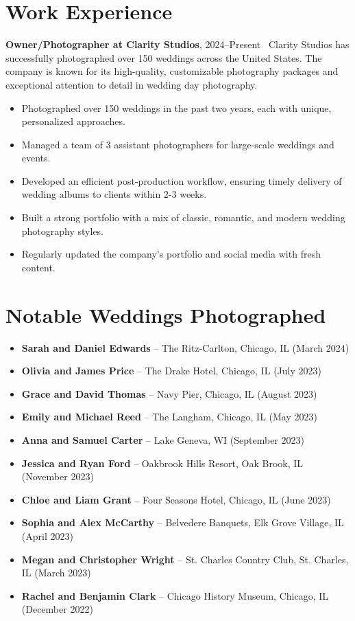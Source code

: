 \documentclass[12pt]{article}
\begin{document}
\section{Work Experience}
\textbf{Owner/Photographer at Clarity Studios}, 2024–Present \
Clarity Studios has successfully photographed over 150 weddings across the United States. The company is known for its high-quality, customizable photography packages and exceptional attention to detail in wedding day photography.

\begin{itemize}
    \item Photographed over 150 weddings in the past two years, each with unique, personalized approaches.
    \item Managed a team of 3 assistant photographers for large-scale weddings and events.
    \item Developed an efficient post-production workflow, ensuring timely delivery of wedding albums to clients within 2-3 weeks.
    \item Built a strong portfolio with a mix of classic, romantic, and modern wedding photography styles.
    \item Regularly updated the company's portfolio and social media with fresh content.
\end{itemize}

\section{Notable Weddings Photographed}
\begin{itemize}
    \item \textbf{Sarah and Daniel Edwards} – The Ritz-Carlton, Chicago, IL (March 2024)
    \item \textbf{Olivia and James Price} – The Drake Hotel, Chicago, IL (July 2023)
    \item \textbf{Grace and David Thomas} – Navy Pier, Chicago, IL (August 2023)
    \item \textbf{Emily and Michael Reed} – The Langham, Chicago, IL (May 2023)
    \item \textbf{Anna and Samuel Carter} – Lake Geneva, WI (September 2023)
    \item \textbf{Jessica and Ryan Ford} – Oakbrook Hills Resort, Oak Brook, IL (November 2023)
    \item \textbf{Chloe and Liam Grant} – Four Seasons Hotel, Chicago, IL (June 2023)
    \item \textbf{Sophia and Alex McCarthy} – Belvedere Banquets, Elk Grove Village, IL (April 2023)
    \item \textbf{Megan and Christopher Wright} – St. Charles Country Club, St. Charles, IL (March 2023)
    \item \textbf{Rachel and Benjamin Clark} – Chicago History Museum, Chicago, IL (December 2022)
\end{itemize}
\end{document}
